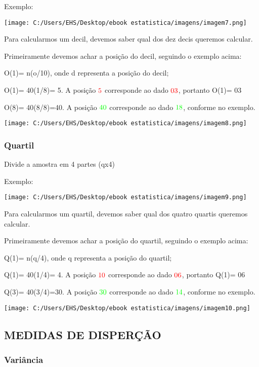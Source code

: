 \documentclass[]{book}
\begin{document}
Exemplo:

\texttt{[image: C:/Users/EHS/Desktop/ebook estatistica/imagens/imagem7.png]}

Para calcularmos um decil, devemos saber qual dos dez decis queremos calcular.

Primeiramente devemos achar a posição do decil, seguindo o exemplo acima:

O(1)= n(o/10), onde d representa a posição do decil;

O(1)= 40(1/8)= 5. A posição \(\color{red}{\text{5}}\) corresponde ao dado \(\color{red}{\text{03}}\), portanto O(1)= 03

O(8)= 40(8/8)=40. A posição \(\color{green}{\text{40}}\) corresponde ao dado \(\color{green}{\text{18}}\), conforme no exemplo.

\texttt{[image: C:/Users/EHS/Desktop/ebook estatistica/imagens/imagem8.png]}

\hypertarget{quartil}{%
\subsubsection{Quartil}\label{quartil}}

Divide a amostra em 4 partes (qx4)

Exemplo:

\texttt{[image: C:/Users/EHS/Desktop/ebook estatistica/imagens/imagem9.png]}

Para calcularmos um quartil, devemos saber qual dos quatro quartis queremos calcular.

Primeiramente devemos achar a posição do quartil, seguindo o exemplo acima:

Q(1)= n(q/4), onde q representa a posição do quartil;

Q(1)= 40(1/4)= 4. A posição \(\color{red}{\text{10}}\) corresponde ao dado \(\color{red}{\text{06}}\), portanto Q(1)= 06

Q(3)= 40(3/4)=30. A posição \(\color{green}{\text{30}}\) corresponde ao dado \(\color{green}{\text{14}}\), conforme no exemplo.

\texttt{[image: C:/Users/EHS/Desktop/ebook estatistica/imagens/imagem10.png]}

\hypertarget{medidas-de-dispercao}{%
\subsection{MEDIDAS DE DISPERÇÃO}\label{medidas-de-dispercao}}

\hypertarget{variancia}{%
\subsubsection{Variância}\label{variancia}}
\end{document}
